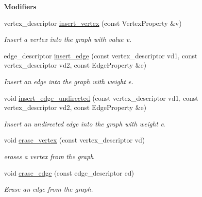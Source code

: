 \begin{Indent}{\bf Modifiers}\par
\begin{DoxyCompactItemize}
\item 
vertex\+\_\+descriptor \hyperlink{classmystl_1_1graph_a733a0df9553be6158ac4c4bbcb21fcea}{insert\+\_\+vertex} (const Vertex\+Property \&v)
\begin{DoxyCompactList}\small\item\em Insert a vertex into the graph with value v. \end{DoxyCompactList}\item 
edge\+\_\+descriptor \hyperlink{classmystl_1_1graph_ae4eee46747666daab648d8ffabb4fbbb}{insert\+\_\+edge} (const vertex\+\_\+descriptor vd1, const vertex\+\_\+descriptor vd2, const Edge\+Property \&e)
\begin{DoxyCompactList}\small\item\em Insert an edge into the graph with weight e. \end{DoxyCompactList}\item 
void \hyperlink{classmystl_1_1graph_a76f7a736aadd6c49c0a24eba2c8657ee}{insert\+\_\+edge\+\_\+undirected} (const vertex\+\_\+descriptor vd1, const vertex\+\_\+descriptor vd2, const Edge\+Property \&e)
\begin{DoxyCompactList}\small\item\em Insert an undirected edge into the graph with weight e. \end{DoxyCompactList}\item 
void \hyperlink{classmystl_1_1graph_acddd1e68646f4deb6b3d0bc90071a120}{erase\+\_\+vertex} (const vertex\+\_\+descriptor vd)
\begin{DoxyCompactList}\small\item\em erases a vertex from the graph \end{DoxyCompactList}\item 
void \hyperlink{classmystl_1_1graph_a9f54888f6de02668996fd9f5ec25769f}{erase\+\_\+edge} (const edge\+\_\+descriptor ed)
\begin{DoxyCompactList}\small\item\em Erase an edge from the graph. \end{DoxyCompactList}\end{DoxyCompactItemize}
\end{Indent}

